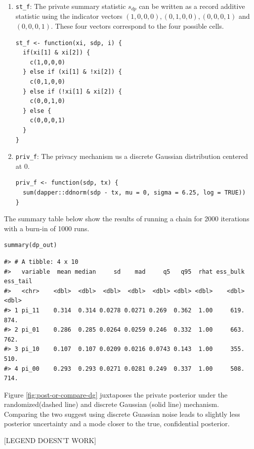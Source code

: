 \begin{enumerate}
\def\labelenumi{\arabic{enumi}.}
\item
  \texttt{st\_f}: The private summary statistic \(s_{dp}\) can be written as a record additive
  statistic using the indicator vectors \((1,0,0,0), (0,1,0,0), (0,0,0,1)\) and \((0,0,0,1)\).
  These four vectors correspond to the four possible cells.

\begin{verbatim}
st_f <- function(xi, sdp, i) {
  if(xi[1] & xi[2]) {
    c(1,0,0,0)
  } else if (xi[1] & !xi[2]) {
    c(0,1,0,0)
  } else if (!xi[1] & xi[2]) {
    c(0,0,1,0)
  } else {
    c(0,0,0,1)
  }
}
\end{verbatim}
\item
  \texttt{priv\_f}: The privacy mechanism us a discrete Gaussian distribution centered
  at 0.

\begin{verbatim}
priv_f <- function(sdp, tx) {
  sum(dapper::ddnorm(sdp - tx, mu = 0, sigma = 6.25, log = TRUE))
}
\end{verbatim}
\end{enumerate}

The summary table below show the results of running a chain for 2000 iterations with a burn-in of 1000 runs.

\begin{verbatim}
summary(dp_out)
\end{verbatim}

\begin{verbatim}
#> # A tibble: 4 x 10
#>   variable  mean median     sd    mad     q5   q95  rhat ess_bulk ess_tail
#>   <chr>    <dbl>  <dbl>  <dbl>  <dbl>  <dbl> <dbl> <dbl>    <dbl>    <dbl>
#> 1 pi_11    0.314  0.314 0.0278 0.0271 0.269  0.362  1.00     619.     874.
#> 2 pi_01    0.286  0.285 0.0264 0.0259 0.246  0.332  1.00     663.     762.
#> 3 pi_10    0.107  0.107 0.0209 0.0216 0.0743 0.143  1.00     355.     510.
#> 4 pi_00    0.293  0.293 0.0271 0.0281 0.249  0.337  1.00     508.     714.
\end{verbatim}

Figure \ref{fig:post-or-compare-dg} juxtaposes the private posterior under the
randomized(dashed line) and discrete Gaussian (solid line) mechanism. Comparing
the two suggest using discrete Guassian noise leads to slightly less
posterior uncertainty and a mode closer to the true, confidential posterior.

{[}LEGEND DOESN'T WORK{]}

